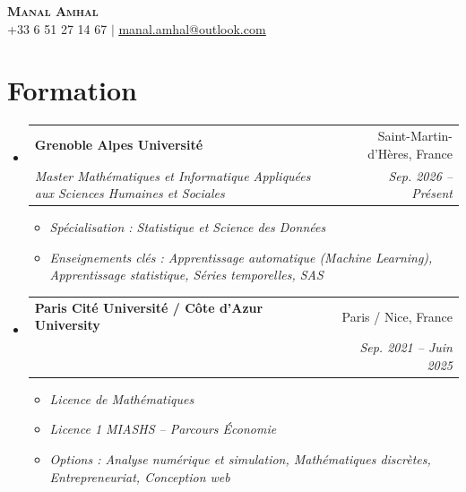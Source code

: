\documentclass[letterpaper,11pt]{article}
\makeatletter
\newcommand{\resumeSubheading}[4]{
  \vspace{-2pt}\item
    \begin{tabular*}{0.97\textwidth}[t]{l@{\extracolsep{\fill}}r}
      \textbf{#1} & #2 \\
      \textit{\small#3} & \textit{\small #4} \\
    \end{tabular*}\vspace{-7pt}
}
\newcommand{\resumeSubHeadingListStart}{\begin{itemize}[leftmargin=0.15in, label={}]}
\newcommand{\resumeSubHeadingListEnd}{\end{itemize}}
\newcommand{\resumeItemListStart}{\begin{itemize}}
\newcommand{\resumeItemListEnd}{\end{itemize}\vspace{-5pt}}
\makeatother
\begin{document}

\begin{center}
    \textbf{\Huge \scshape Manal Amhal} \\ \vspace{1pt}
    \small +33 6 51 27 14 67 $|$ \href{mailto:manal.amhal@outlook.com}{\underline{manal.amhal@outlook.com}} %
\end{center}


\section{Formation}
  \resumeSubHeadingListStart
    \resumeSubheading
      {Grenoble Alpes Université}{Saint-Martin-d'Hères, France}
      {Master Mathématiques et Informatique Appliquées aux Sciences Humaines et Sociales}{Sep. 2026 -- Présent}
      \resumeItemListStart
        \item[] \small{\textit{Spécialisation : Statistique et Science des Données}}
        \item[] \small{\textit{Enseignements clés : Apprentissage automatique (Machine Learning), Apprentissage statistique, Séries temporelles, SAS}}
      \resumeItemListEnd

    \resumeSubheading
      {Paris Cité Université / Côte d'Azur University}{Paris / Nice, France}
      {}{Sep. 2021 -- Juin 2025}
      \vspace{-2pt}
      \resumeItemListStart
        \item[] \small{\textit{Licence de Mathématiques }}
         \item[] \small{\textit{Licence 1 MIASHS – Parcours Économie}}
        \item[] \small{\textit{Options : Analyse numérique et simulation, Mathématiques discrètes, Entrepreneuriat, Conception web}}
      \resumeItemListEnd
  \resumeSubHeadingListEnd
\end{document}
